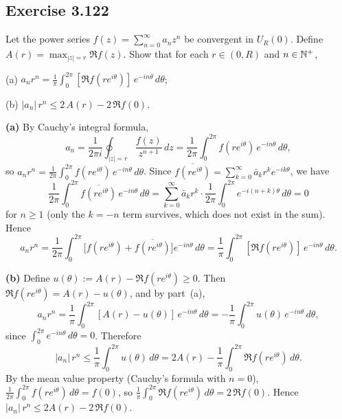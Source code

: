 \documentclass{article}
\begin{document}
\subsection{Exercise 3.122}

Let the power series $f(z) = \sum_{n=0}^{\infty} a_n z^n$
be convergent in $U_R(0)$.
Define $A(r) = \max_{|z|=r} \Re f(z)$.
Show that for each $r \in (0, R)$ and $n \in \mathbb{N}^+$,

(a) $\displaystyle a_n r^n
= \frac{1}{\pi}\int_0^{2\pi}
[\Re f(r e^{i\theta})]\,e^{-in\theta}\,d\theta$;

(b) $|a_n|\,r^n \le 2\,A(r) - 2\,\Re f(0)$.

\begin{solution}
  \textbf{(a)}\;
  By Cauchy's integral formula,
  \[
    a_n = \frac{1}{2\pi i}\oint_{|z|=r}
    \frac{f(z)}{z^{n+1}}\,dz
    = \frac{1}{2\pi}\int_0^{2\pi} f(re^{i\theta})\,e^{-in\theta}\,d\theta,
  \]
  so $a_n r^n = \frac{1}{2\pi}\int_0^{2\pi}
  f(re^{i\theta})\,e^{-in\theta}\,d\theta$.
  Since $\overline{f(re^{i\theta})} = \sum_{k=0}^{\infty}
  \bar{a}_k r^k e^{-ik\theta}$, we have
  \[
    \frac{1}{2\pi}\int_0^{2\pi}
    \overline{f(re^{i\theta})}\,e^{-in\theta}\,d\theta
    = \sum_{k=0}^{\infty}\bar{a}_k r^k
    \cdot\frac{1}{2\pi}\int_0^{2\pi}e^{-i(n+k)\theta}\,d\theta = 0
  \]
  for $n \ge 1$ (only the $k = -n$ term survives, which does not
  exist in the sum).
  Hence
  \[
    a_n r^n
    = \frac{1}{2\pi}\int_0^{2\pi}
    \bigl[f(re^{i\theta})
    + \overline{f(re^{i\theta})}\bigr]e^{-in\theta}\,d\theta
    = \frac{1}{\pi}\int_0^{2\pi}
    [\Re f(re^{i\theta})]\,e^{-in\theta}\,d\theta.
  \]

  \medskip

  \textbf{(b)}\;
  Define $u(\theta) := A(r) - \Re f(re^{i\theta}) \ge 0$.
  Then $\Re f(re^{i\theta}) = A(r) - u(\theta)$, and by part~(a),
  \[
    a_n r^n
    = \frac{1}{\pi}\int_0^{2\pi}[A(r)-u(\theta)]\,e^{-in\theta}\,d\theta
    = -\frac{1}{\pi}\int_0^{2\pi}u(\theta)\,e^{-in\theta}\,d\theta,
  \]
  since $\int_0^{2\pi}e^{-in\theta}\,d\theta = 0$.
  Therefore
  \[
    |a_n|\,r^n
    \le \frac{1}{\pi}\int_0^{2\pi}u(\theta)\,d\theta
    = 2A(r) - \frac{1}{\pi}\int_0^{2\pi}\Re f(re^{i\theta})\,d\theta.
  \]
  By the mean value property (Cauchy's formula with $n = 0$),
  $\frac{1}{2\pi}\int_0^{2\pi}f(re^{i\theta})\,d\theta = f(0)$,
  so $\frac{1}{\pi}\int_0^{2\pi}\Re f(re^{i\theta})\,d\theta
  = 2\,\Re f(0)$.
  Hence $|a_n|\,r^n \le 2A(r) - 2\,\Re f(0)$.\qedhere
\end{solution}
\end{document}
